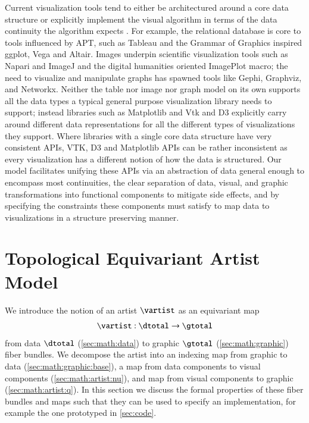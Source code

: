 \documentclass[journal]{vgtc}                %
\begin{document}
Current visualization tools tend to either be architectured around a core data structure\cite{HeerSoftware2006} or explicitly implement the visual algorithm in terms of the data continuity the algorithm expects \cite{toryRethinkingVisualizationHighlevel2004}.  For example, the relational database is core to tools influenced by APT, such as Tableau\cite{StoltePolaris2002,hanrahanVizQL2006,MackinlayShowme2007} and the Grammar of Graphics\cite{wilkinsonGrammarGraphics2005} inspired ggplot\cite{wickhamGgplot2ElegantGraphics2016a}, Vega\cite{satyanarayanDeclarativeInteractionDesign2014} and Altair\cite{vanderplasAltairInteractiveStatistical2018}. Images underpin scientific visualization tools such as Napari\cite{nicholas_sofroniew_2021_4533308} and ImageJ\cite{schneiderNIHImageImageJ2012} and the digital humanities oriented ImagePlot\cite{studiesCulturevisImageplot2021} macro; the need to visualize and manipulate graphs has spawned tools like Gephi\cite{bastianGephiOpenSource2009}, Graphviz\cite{ellsonGraphvizOpenSource2002}, and Networkx\cite{HagbergExploringNetwork2008}. Neither the table nor image nor graph model on its own supports all the data types a typical general purpose visualization library needs to support; instead libraries such as Matplotlib\cite{hunterMatplotlib2DGraphics2007} and Vtk\cite{hanwellVisualizationToolkitVTK2015, geveci2012vtk} and D3 \cite{bostockDataDrivenDocuments2011} explicitly carry around different data representations for all the different types of visualizations they support.  Where libraries with a single core data structure have very consistent APIs, VTK, D3 and Matplotlib APIs can be rather inconsistent as every visualization has a different notion of how the data is structured. Our model facilitates unifying these APIs via an abstraction of data general enough to encompass most continuities, the clear separation of data, visual, and graphic transformations into functional components to mitigate side effects\cite{loudenProgrammingLanguagesPrinciples2010}, and by specifying the constraints these components must satisfy to map data to visualizations in a structure preserving manner. 


\section{Topological Equivariant Artist Model}
\label{sec:math}
We introduce the notion of an artist $\mathscr{\vartist}$ as an equivariant map
\begin{equation}
    \label{eq:artist}
    \mathscr{\vartist}: \mathscr{\dtotal} \rightarrow \mathscr{\gtotal}
\end{equation}
from data $\mathscr{\dtotal}$ (\autoref{sec:math:data}) to graphic $\mathscr{\gtotal}$ (\autoref{sec:math:graphic}) fiber bundles. We decompose the artist into an indexing map from graphic to data (\autoref{sec:math:graphic:base}), a map from data components to visual components (\autoref{sec:math:artist:nu}), and map from visual components to graphic (\autoref{sec:math:artist:q}). In this section we discuss the formal properties of these fiber bundles and maps such that they can be used to specify an implementation, for example the one prototyped in \autoref{sec:code}. 
\end{document}
